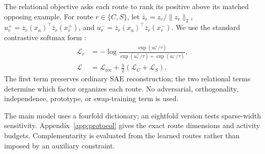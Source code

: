 The relational objective asks each route to rank its positive above its matched opposing example. For route $r\in\{C,S\}$, let $\bar z_r=z_r/\lVert z_r\rVert_2$, $u_r^+=\bar z_r(x_a)^\top\bar z_r(x_r^+)$, and $u_r^-=\bar z_r(x_a)^\top\bar z_r(x_r^-)$. We use the standard contrastive softmax form \citep{oord2018cpc,zimmermann2021contrastive}:
\begin{equation}
\begin{aligned}
\mathcal{L}_r&=-\log\frac{\exp(u_r^+/\tau)}
{\exp(u_r^+/\tau)+\exp(u_r^-/\tau)},\\
\mathcal{L}&=\mathcal{L}_{\mathrm{rec}}
+\frac{\lambda}{2}(\mathcal{L}_C+\mathcal{L}_S).
\end{aligned}
\label{eq:route-loss}
\end{equation}
The first term preserves ordinary SAE reconstruction; the two relational terms determine which factor organizes each route. No adversarial, orthogonality, independence, prototype, or swap-training term is used.

The main model uses a fourfold dictionary; an eightfold version tests sparse-width sensitivity. Appendix~\ref{app:protocol} gives the exact route dimensions and activity budgets. Complementarity is evaluated from the learned routes rather than imposed by an auxiliary constraint.
